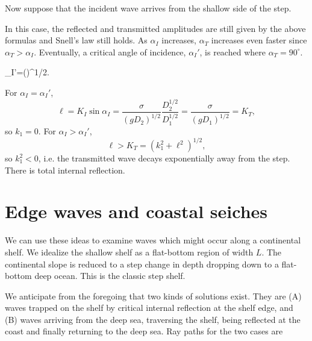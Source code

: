 Now suppose that the incident wave arrives from the shallow side of the step.

\sourcepagebreak


In this case, the reflected and transmitted amplitudes are still given by the above
formulas and Snell's law still holds. As $\alpha_I$ increases, $\alpha_T$ increases even
faster since $\alpha_T>\alpha_I$. Eventually, a critical angle of incidence,
$\alpha_I'$, is reached where $\alpha_T=90^\circ$.


\begin{waveequation}
	\sin\alpha_I'=\left(\right)^{1/2}.
\end{waveequation}
For $\alpha_I=\alpha_I'$,
\[
	\ell=K_I\sin\alpha_I
	=\frac{\sigma}{(gD_2)^{1/2}}
	\frac{D_2^{1/2}}{D_1^{1/2}}
	=\frac{\sigma}{(gD_1)^{1/2}}
	=K_T,
\]
so $k_1=0$. For $\alpha_I>\alpha_I'$,
\[
	\ell>K_T=(k_1^2+\ell^2)^{1/2},
\]
so $k_1^2<0$, i.e. the transmitted wave decays exponentially away from the step. There
is total internal reflection.

\sourcepagebreak

\section{Edge waves and coastal seiches}

We can use these ideas to examine waves which might occur along a continental shelf.
We idealize the shallow shelf as a flat-bottom region of width $L$. The continental
slope is reduced to a step change in depth dropping down to a flat-bottom deep ocean.
This is the classic step shelf.


\wavefiguremark

We anticipate from the foregoing that two kinds of solutions exist. They are (A) waves
trapped on the shelf by critical internal reflection at the shelf edge, and (B) waves
arriving from the deep sea, traversing the shelf, being reflected at the coast and
finally returning to the deep sea. Ray paths for the two cases are

